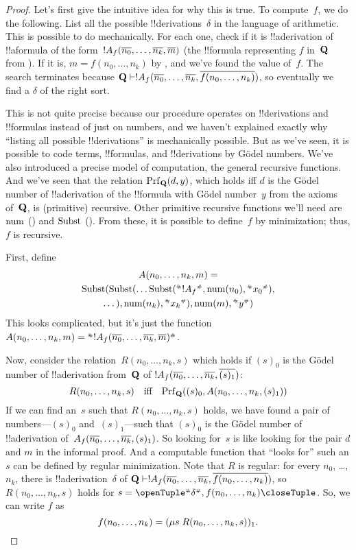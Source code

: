 \documentclass[../../../include/open-logic-section]{subfiles}
\begin{document}
\begin{proof}
Let's first give the intuitive idea for why this is true. To
compute~$f$, we do the following.  List all the possible
!!{derivation}s~$\delta$ in the language of arithmetic. This is
possible to do mechanically. For each one, check if it is
!!a{derivation} of !!a{formula} of the form~$!A_f(\overline{n_0}, \dots,
\overline{n_k}, \overline{m})$ (the !!{formula} representing $f$ in~$\mathbf{Q}$
from ). If it is, $m = f(n_0, \dots, n_k)$ by
, and we've found the value of~$f$. The search
terminates because $\Th{Q} \Proves !A_f(\num{n_0}, \dots, \num{n_k},
\num{f(n_0, \dots, n_k)})$, so eventually we find a $\delta$ of the
right sort.

This is not quite precise because our procedure operates on
!!{derivation}s and !!{formula}s instead of just on numbers, and we
haven't explained exactly why ``listing all possible !!{derivation}s''
is mechanically possible.  But as we've seen, it is possible to code
terms, !!{formula}s, and !!{derivation}s by G\"odel numbers. We've
also introduced a precise model of computation, the general recursive
functions. And we've seen that the relation $\Prf[\Th{Q}](d,y)$, which
holds iff $d$ is the G\"odel number of !!a{derivation} of the !!{formula}
with G\"odel number~$y$ from the axioms of~$\mathbf{Q}$, is (primitive)
recursive. Other primitive recursive functions we'll need are
$\mathrm{num}$ () and $\mathrm{Subst}$
().  From these, it is possible to
define~$f$ by minimization; thus, $f$ is recursive.

First, define
\begin{multline*}
  A(n_0, \dots, n_k, m) = \\
  \fn{Subst}(\fn{Subst}(\dots\fn{Subst}(\Gn{!A_f}, \fn{num}(n_0), \Gn{x_0}),\\ \dots),
  \fn{num}(n_k),  \Gn{x_k}), \fn{num}(m), \Gn{y})
\end{multline*}
This looks complicated, but it's just the function $A(n_0, \dots, n_k,
m) = \Gn{!A_f(\num{n_0}, \dots, \num{n_k}, \num{m})}$.

Now, consider the relation~$R(n_0, \dots, n_k, s)$ which holds if
$(s)_0$ is the G\"odel number of !!a{derivation} from~$\mathbf{Q}$ of
$!A_f(\overline{n_0}, \dots, \overline{n_k}, \overline{(s)_1})$:
\[
R(n_0, \dots, n_k, s) \quad\text{iff}\quad \Prf[\Th{Q}]((s)_0, A(n_0,
\dots, n_k, (s)_1))
\]
If we can find an~$s$ such that $R(n_0, \dots, n_k, s)$ holds, we have
found a pair of numbers---$(s)_0$ and~$(s)_1$---such that $(s)_0$ is
the G\"odel number of !!a{derivation} of~$A_f(\overline{n_0}, \dots,
\overline{n_k}, (s)_1)$. So looking for~$s$ is like looking for the pair
$d$ and $m$ in the informal proof. And a computable function that
``looks for'' such an $s$ can be defined by regular minimization.
Note that $R$ is regular: for every $n_0$, \dots, $n_k$, there is
!!a{derivation}~$\delta$ of $\Th{Q} \Proves !A_f(\num{n_0}, \dots,
\num{n_k}, \num{f(n_0, \dots, n_k)})$, so $R(n_0, \dots, n_k, s)$
holds for $s = \tuple{\Gn{\delta}, f(n_0, \dots, n_k)}$.  So, we can
write $f$ as
\[
f(n_0,\dots,n_{k}) = (\mu s \; R(n_0, \dots, n_k, s))_1.
\]
\end{proof}
\end{document}
